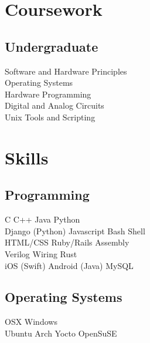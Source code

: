 \documentclass[]{deedy-resume-openfont}
\begin{document}
\begin{minipage}[t]{0.33\textwidth}

\section{Coursework}
\subsection{Undergraduate}
Software and Hardware Principles \\
Operating Systems \\
Hardware Programming \\
Digital and Analog Circuits \\
Unix Tools and Scripting \\
\sectionsep


\section{Skills}
\subsection{Programming}
C \textbullet{} C++ \textbullet{} Java \textbullet{} Python \\
Django (Python) \textbullet{} Javascript \textbullet{} Bash Shell \\ 
HTML/CSS \textbullet{} Ruby/Rails \textbullet{} Assembly \\
Verilog \textbullet{} Wiring \textbullet{} Rust \\
iOS (Swift) \textbullet{} Android (Java) \textbullet{} MySQL \\
\medskip
\subsection{Operating Systems}
OSX \textbullet{} Windows \\
Ubuntu \textbullet{} Arch \textbullet{} Yocto \textbullet{} OpenSuSE
\sectionsep

%
%

\end{minipage} 
\hfill
\end{document}
